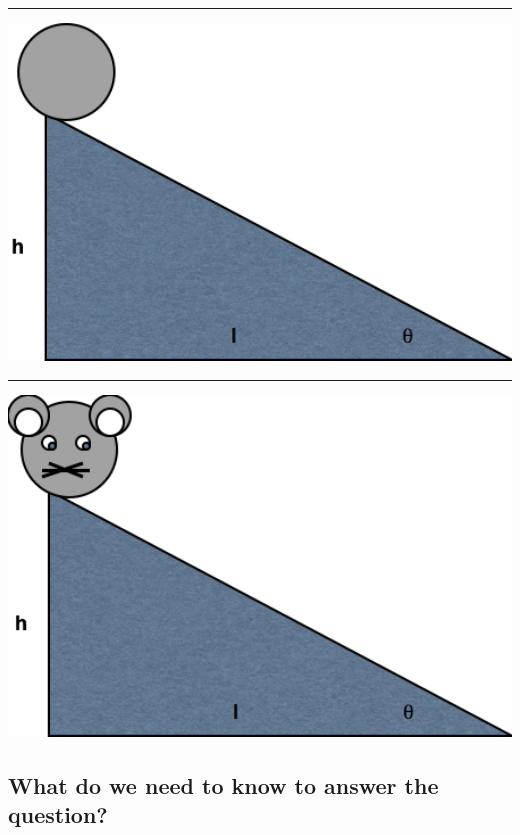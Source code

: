 \documentclass[]{article}
\begin{document}
\begin{center}\rule{0.5\linewidth}{\linethickness}\end{center}

\begin{center}\includegraphics[width=800px]{img/psych-harder-1} \end{center}

\begin{center}\rule{0.5\linewidth}{\linethickness}\end{center}

\begin{center}\includegraphics[width=800px]{img/psych-harder-2} \end{center}

\hypertarget{what-do-we-need-to-know-to-answer-the-question}{%
\subsection{What do we need to know to answer the
question?}\label{what-do-we-need-to-know-to-answer-the-question}}
\end{document}
